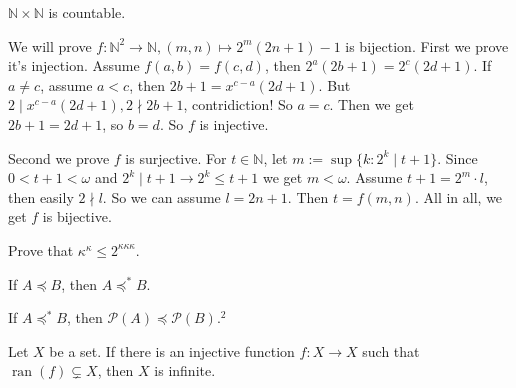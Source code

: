 \documentclass{ctexart}
\begin{document}
\begin{problem}
 $\mathbb{N} \times \mathbb{N}$ is countable.
\end{problem}

\begin{solution}
 We will prove $f:\mathbb{N}^2\to \mathbb{N},(m,n)\mapsto 2^m(2n+1)-1$ is bijection. First we prove it's injection. Assume $f(a,b)=f(c,d)$, then $2^a(2b+1)=2^c(2d+1)$. If $a\neq c$, assume $a<c$, then $2b+1=x^{c-a}(2d+1)$. But $2\mid x^{c-a}(2d+1),2\nmid 2b+1$, contridiction! So $a=c$. Then we get $2b+1=2d+1$, so $b=d$. So $f$ is injective. 

 Second we prove $f$ is surjective. For $t\in \mathbb{N}$, let $m:=\sup\{k:2^k\mid t+1\}$. Since $0<t+1<\omega$ and $2^k\mid t+1\to 2^k\leq t+1$ we get $m<\omega$. Assume $t+1=2^m\cdot l$, then easily $2\nmid l$. So we can assume $l=2n+1$. Then $t=f(m,n)$. 
 All in all, we get $f$ is bijective.
\end{solution}

\begin{problem}
 Prove that $\kappa^\kappa \leq 2^{\kappa \kappa \kappa}$.
\end{problem}

\begin{problem}
 If $A \preccurlyeq B$, then $A \preccurlyeq^* B$.
\end{problem}

\begin{problem}
 If $A \preccurlyeq^* B$, then $\mathscr{P}(A) \preccurlyeq \mathscr{P}(B) .^2$
\end{problem}

\begin{problem}
 Let $X$ be a set. If there is an injective function $f: X \rightarrow X$ such that $\operatorname{ran}(f) \subsetneq X$, then $X$ is infinite.
\end{problem}
\end{document}

